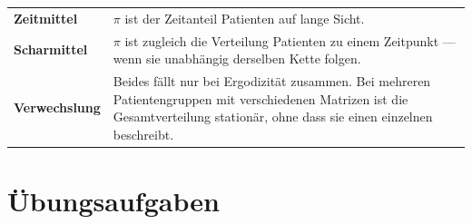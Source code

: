 \begin{warnung}
\begin{center}
{\small
\renewcommand{\arraystretch}{1.52}
\begin{tabular}{@{}P{2.6cm}P{6.0cm}@{}}
\toprule
\textbf{Zeitmittel} & $\pi$ ist der Zeitanteil  Patienten auf lange Sicht.\\
\textbf{Scharmittel} & $\pi$ ist zugleich die Verteilung  Patienten zu einem Zeitpunkt --- wenn sie unabhängig derselben Kette folgen.\\
\textbf{Verwechslung} & Beides fällt nur bei Ergodizität zusammen. Bei mehreren Patientengruppen mit verschiedenen Matrizen ist die Gesamtverteilung stationär, ohne dass sie einen einzelnen beschreibt.\\
\bottomrule
\end{tabular}}
\end{center}

\begin{center}
\begin{minipage}{0.88\textwidth}
\end{minipage}
\end{center}
\end{warnung}

\section{Übungsaufgaben}

